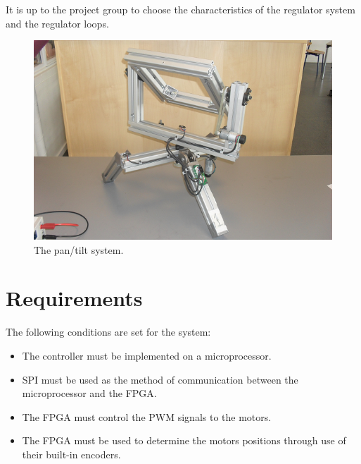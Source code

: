 It is up to the project group to choose the characteristics of the regulator system and the regulator loops.

\begin{figure}[htb]
	\centering
	\includegraphics[width=\textwidth]{graphics/pantiltsystem.png} %
	\caption{The pan/tilt system.}
	\label{fig:pantiltsystem}
\end{figure}

\pagebreak
\section{Requirements}
The following conditions are set for the system:
\begin{itemize}
\item The controller must be implemented on a microprocessor.
\item SPI must be used as the method of communication between the microprocessor and the FPGA.
\item The FPGA must control the PWM signals to the motors.
\item The FPGA must be used to determine the motors positions through use of  their built-in encoders.
\end{itemize}